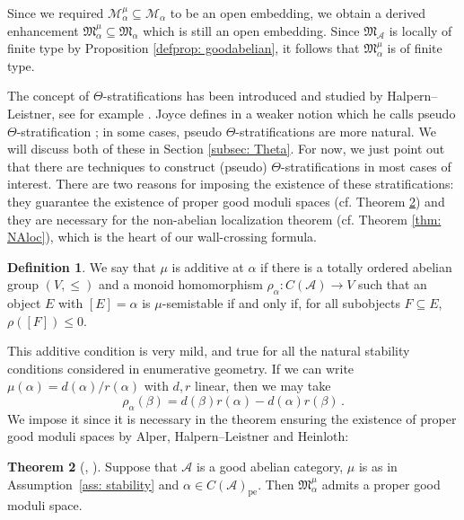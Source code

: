 \documentclass[12pt]{amsart}
\theoremstyle{definition}
\newtheorem{definition}{Definition}[section]
\newtheorem{theorem}[definition]{Theorem}
\newcommand{\CA}{{\mathcal A}}
\newcommand{\CM}{{\mathcal M}}
\newcommand{\1}{\mathbf 1}
\newcommand{\FM}{{\mathfrak{M}}}
\newcommand{\pe}{\mathrm{pe}}
\begin{document}
Since we required $\CM^{\mu}_{\alpha}\subseteq \CM_\alpha$ to be an open embedding, we obtain a derived enhancement $\FM_\alpha^\mu\subseteq \FM_\alpha$ which is still an open embedding. Since $\FM_\CA$ is locally of finite type by Proposition \ref{defprop: goodabelian}, it follows that $\FM_\alpha^\mu$ is of finite type.

The concept of $\Theta$-stratifications has been introduced and studied by Halpern--Leistner, see for example \cite[Definition 2.1.2]{HLstructure}. Joyce defines in \cite[Definition 3.3.4]{joyce} a weaker notion which he calls pseudo $\Theta$-stratification \cite[Definition 3.3.4]{joyce}; in some cases, pseudo $\Theta$-stratifications are more natural. We will discuss both of these in Section \ref{subsec: Theta}. For now, we just point out that there are techniques to construct (pseudo) $\Theta$-stratifications in most cases of interest. There are two reasons for imposing the existence of these stratifications: they guarantee the existence of proper good moduli spaces (cf. Theorem \ref{thm: goodproper}) and they are necessary for the non-abelian localization theorem (cf. Theorem \ref{thm: NAloc}), which is the heart of our wall-crossing formula. 

\begin{definition}\label{def: additive} We say that $\mu$ is additive at $\alpha$ if there is a totally ordered abelian group $(V, \leq)$ and a monoid homomorphism $\rho_\alpha: C(\mathcal A) \to V$ such that an object $E$ with $[E]= \alpha$ is $\mu$-semistable if and only if, for all subobjects $F \subseteq E$, $\rho([F]) \leq 0$.
\end{definition}

This additive condition is very mild, and true for all the natural stability conditions considered in enumerative geometry. If we can write $\mu(\alpha)=d(\alpha)/r(\alpha)$ with $d,r$ linear, then we may take 
\[\rho_\alpha(\beta)=d(\beta)r(\alpha)-d(\alpha)r(\beta)\,.\]
We impose it since it is necessary in the theorem ensuring the existence of proper good moduli spaces by Alper, Halpern--Leistner and Heinloth:

\begin{theorem}[{\cite[Theorem 7.27]{AHLH}, \cite[Theorem 3.43]{joyce}}]\label{thm: goodproper} Suppose that $\mathcal A$ is a good abelian category, $\mu$ is as in Assumption~\ref{ass: stability} and $\alpha\in C(\CA)_{\pe}$. Then $\FM_\alpha^\mu$ admits a proper good moduli space.
\end{theorem}
\end{document}
